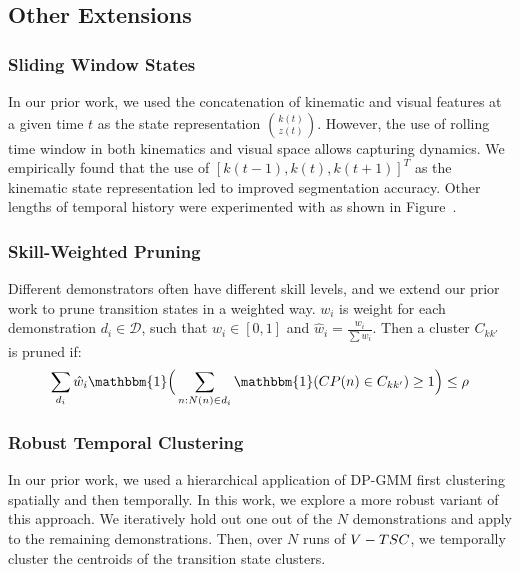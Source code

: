 \subsection{Other Extensions}
\subsubsection{Sliding Window States}
In our prior work, we used the concatenation of kinematic and visual features at a given time $t$ as the state representation $\binom{k(t)}{z(t)}$. However, the use of rolling time window in both kinematics and visual space allows capturing dynamics. 
We empirically found that the use of $[k(t-1), k(t), k(t+1)]^T$ as the kinematic state representation led to improved segmentation accuracy. Other lengths of temporal history were experimented with as shown in Figure~.

\subsubsection{Skill-Weighted Pruning} 
Different demonstrators often have different skill levels, and we extend our prior work to prune transition states in a weighted way.
$w_i$ is weight for each demonstration $d_i \in \mathcal{D}$, such that $w_i \in [0,1]$ and $\hat{w}_i = \frac{w_i}{\sum w_i}$. Then a cluster $C_{kk'}$ is pruned if: 
\[\sum_{d_i} \hat{w}_i\mathbbm{1}\Big( \sum_{n:N(n)\in d_i} \mathbbm{1}( CP(n) \in C_{kk'}) \geq 1 \Big) \leq \rho 
\]

\subsubsection{Robust Temporal Clustering}
In our prior work, we used a hierarchical application of DP-GMM first clustering spatially and then temporally. 
In this work, we explore a more robust variant of this approach.
We iteratively hold out one out of the $N$ demonstrations and apply \tsc to the remaining demonstrations.
Then, over $N$ runs of $V-TSC$, we temporally cluster the centroids of the transition state clusters.









